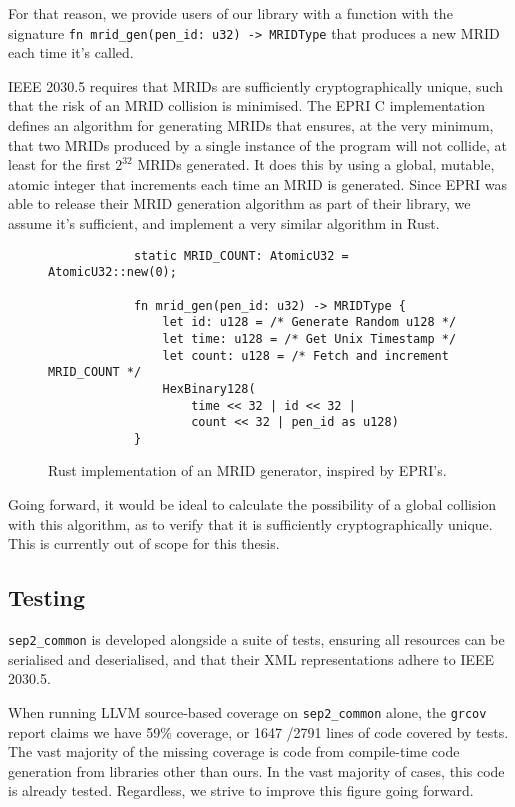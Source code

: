 For that reason, we provide users of our library with a function with the signature \texttt{fn mrid\_gen(pen\_id: u32) -> MRIDType} that produces a new MRID each time it's called.

IEEE 2030.5 requires that MRIDs are sufficiently cryptographically unique, such that the risk of an MRID collision is minimised. The EPRI C implementation defines an algorithm for generating MRIDs that ensures, at the very minimum, that two MRIDs produced by a single instance of the program will not collide, at least for the first $2^{32}$ MRIDs generated. It does this by using a global, mutable, atomic integer that increments each time an MRID is generated. Since EPRI was able to release their MRID generation algorithm as part of their library, we assume it's sufficient, and implement a very similar algorithm in Rust.

\begin{figure}[H]
    \begin{center}
        \begin{lstlisting}
            static MRID_COUNT: AtomicU32 = AtomicU32::new(0);

            fn mrid_gen(pen_id: u32) -> MRIDType {
                let id: u128 = /* Generate Random u128 */
                let time: u128 = /* Get Unix Timestamp */
                let count: u128 = /* Fetch and increment MRID_COUNT */
                HexBinary128(
                    time << 32 | id << 32 | 
                    count << 32 | pen_id as u128)
            }
        \end{lstlisting}
        \label{fig:mridgenalgo}
        \caption{Rust implementation of an MRID generator, inspired by EPRI's.}
    \end{center}
\end{figure}


Going forward, it would be ideal to calculate the possibility of a global collision with this algorithm, as to verify that it is sufficiently cryptographically unique. This is currently out of scope for this thesis.

\subsection{Testing}
\texttt{sep2\_common} is developed alongside a suite of tests, ensuring all resources can be serialised and deserialised, and that their XML representations adhere to IEEE 2030.5.

When running LLVM source-based coverage on \texttt{sep2\_common} alone, the \texttt{grcov} report claims we have 59\% coverage, or 1647 \slash 2791 lines of code covered by tests. The vast majority of the missing coverage is code from compile-time code generation from libraries other than ours. In the vast majority of cases, this code is already tested. Regardless, we strive to improve this figure going forward.

